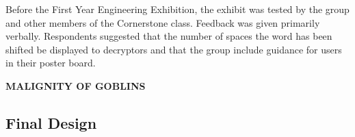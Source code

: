 \documentclass[conference]{IEEEtran}
\begin{document}
\par Before the First Year Engineering Exhibition, the exhibit was tested by the group and other members of the Cornerstone class.  Feedback was given primarily verbally.  Respondents suggested that the number of spaces the word has been shifted be displayed to decryptors and that the group include guidance for users in their poster board.  


\vspace{10pt} \LARGE \textbf{MALIGNITY OF GOBLINS} \normalsize

\subsection{Final Design}
\end{document}
